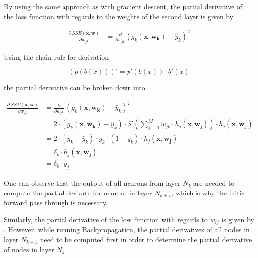 By using the same approach as with gradient descent, the partial derivative of the loss function with regards to the weights of the second layer is given by

\begin{equation}
    \begin{split}
        \frac{\partial ~ SSE(\bm{x}, \bm{w})}{\partial w_{jk}}
        &= \frac{\partial}{\partial w_{jk}} (g_k(\bm{x},\bm{w_k}) - \hat{y}_{k})^2
    \end{split}
\end{equation}

Using the chain rule for derivation

\begin{equation}
    (p(b(x)))' = p'(b(x)) \cdot b'(x)
\end{equation}

the partial derivative can be broken down into

\begin{equation}
    \begin{split}
        \frac{\partial ~ SSE(\bm{x}, \bm{w})}{\partial w_{jk}}
        &= \frac{\partial}{\partial w_{jk}} ~ (g_k(\bm{x},\bm{w_k}) - \hat{y}_{k})^2 \\
        &= 2 \cdot (g_k(\bm{x},\bm{w_k}) - \hat{y}_{k}) \cdot  S'\left(\sum_{j=0}^M w_{jk} \cdot h_j(\bm{x}, \bm{w_j})\right) \cdot h_j(\bm{x}, \bm{w}_j) \\
        &= 2 \cdot (y_k - \hat{y}_{k}) \cdot  y_k \cdot (1 - y_k) \cdot h_j(\bm{x}, \bm{w_j}) \\
        &= \delta_k \cdot h_j(\bm{x}, \bm{w_j}) \\
        &= \delta_k \cdot y_j
    \end{split}
\end{equation}

One can observe that the output of all neurons from layer $N_{k}$ are needed to compute the partial derivate for neurons in layer $N_{k+1}$, which is why the initial forward pass through is necessary.

Similarly, the partial derivative of the loss function with regards to $w_{ij}$ is given by .
However, while running Backpropagation, the partial derivatives of all nodes in layer $N_{k+1}$ need to be computed first in order to determine the partial derivative of nodes in layer $N_{k}$ \cite{rojas_neural_1996}.

